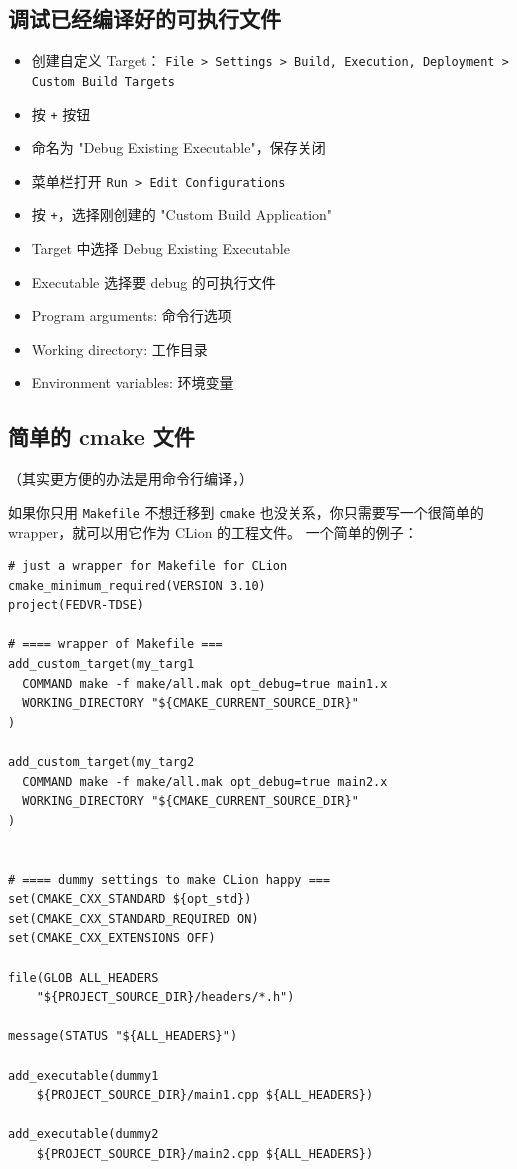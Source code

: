 \subsection{调试已经编译好的可执行文件}\label{sub_CLionN_1}
\begin{itemize}
\item 创建自定义 Target： \verb`File > Settings > Build, Execution, Deployment > Custom Build Targets`
\item 按 \verb`+` 按钮
\item 命名为 "Debug Existing Executable"，保存关闭
\item 菜单栏打开 \verb`Run > Edit Configurations`
\item 按 \verb`+`，选择刚创建的 "Custom Build Application"
\item Target 中选择 Debug Existing Executable
\item Executable 选择要 debug 的可执行文件
\item Program arguments: 命令行选项
\item Working directory: 工作目录
\item Environment variables: 环境变量
\end{itemize}

\subsection{简单的 cmake 文件}
（其实更方便的办法是用命令行编译，）

如果你只用 \verb`Makefile` 不想迁移到 \verb`cmake` 也没关系，你只需要写一个很简单的 wrapper，就可以用它作为 CLion 的工程文件。 一个简单的例子：
\begin{lstlisting}[language=none]
# just a wrapper for Makefile for CLion
cmake_minimum_required(VERSION 3.10)
project(FEDVR-TDSE)

# ==== wrapper of Makefile ===
add_custom_target(my_targ1
  COMMAND make -f make/all.mak opt_debug=true main1.x
  WORKING_DIRECTORY "${CMAKE_CURRENT_SOURCE_DIR}"
)

add_custom_target(my_targ2
  COMMAND make -f make/all.mak opt_debug=true main2.x
  WORKING_DIRECTORY "${CMAKE_CURRENT_SOURCE_DIR}"
)


# ==== dummy settings to make CLion happy ===
set(CMAKE_CXX_STANDARD ${opt_std})
set(CMAKE_CXX_STANDARD_REQUIRED ON)
set(CMAKE_CXX_EXTENSIONS OFF)

file(GLOB ALL_HEADERS
    "${PROJECT_SOURCE_DIR}/headers/*.h")

message(STATUS "${ALL_HEADERS}")

add_executable(dummy1
    ${PROJECT_SOURCE_DIR}/main1.cpp ${ALL_HEADERS})

add_executable(dummy2
    ${PROJECT_SOURCE_DIR}/main2.cpp ${ALL_HEADERS})
\end{lstlisting}

